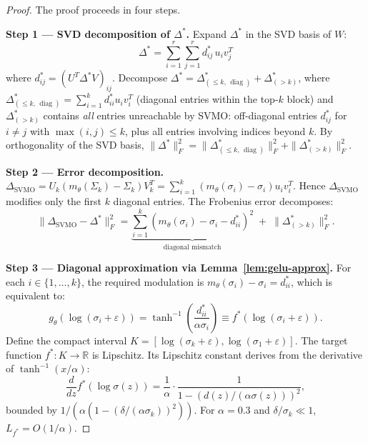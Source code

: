 \documentclass{scpe}
\newcommand{\RR}{\mathbb{R}}
\newcommand{\diag}{\operatorname{diag}}
\begin{document}
\begin{proof}
The proof proceeds in four steps.

\textbf{Step 1 --- SVD decomposition of $\Delta^*$.}
Expand $\Delta^*$ in the SVD basis of $W$:
\begin{equation}
\Delta^* = \sum_{i=1}^r \sum_{j=1}^r d_{ij}^* \, u_i v_j^T
\end{equation}
where $d_{ij}^* = (U^T \Delta^* V)_{ij}$. Decompose $\Delta^* = \Delta^*_{(\leq k,\, \diag)} + \Delta^*_{(>k)}$, where $\Delta^*_{(\leq k,\, \diag)} = \sum_{i=1}^k d_{ii}^* u_i v_i^T$ (diagonal entries within the top-$k$ block) and $\Delta^*_{(>k)}$ contains \textit{all} entries unreachable by SVMO: off-diagonal entries $d_{ij}^*$ for $i \neq j$ with $\max(i,j) \leq k$, plus all entries involving indices beyond $k$. By orthogonality of the SVD basis, $\|\Delta^*\|_F^2 = \|\Delta^*_{(\leq k,\, \diag)}\|_F^2 + \|\Delta^*_{(>k)}\|_F^2$.

\textbf{Step 2 --- Error decomposition.}
$\Delta_{\text{SVMO}} = U_k(m_\theta(\Sigma_k) - \Sigma_k)V_k^T = \sum_{i=1}^k (m_\theta(\sigma_i) - \sigma_i) u_i v_i^T$. Hence $\Delta_{\text{SVMO}}$ modifies only the first $k$ diagonal entries. The Frobenius error decomposes:
\begin{equation}
\|\Delta_{\text{SVMO}} - \Delta^*\|_F^2 = \underbrace{\sum_{i=1}^k (m_\theta(\sigma_i) - \sigma_i - d_{ii}^*)^2}_{\text{diagonal mismatch}} \;+\; \|\Delta^*_{(>k)}\|_F^2.
\end{equation}

\textbf{Step 3 --- Diagonal approximation via Lemma~\ref{lem:gelu-approx}.}
For each $i \in \{1,\dots,k\}$, the required modulation is $m_\theta(\sigma_i) - \sigma_i = d_{ii}^*$, which is equivalent to:
\begin{equation}
g_\theta(\log(\sigma_i + \varepsilon)) = \tanh^{-1}\!\left(\frac{d_{ii}^*}{\alpha\sigma_i}\right) \equiv f^*(\log(\sigma_i + \varepsilon)).
\end{equation}
Define the compact interval $K = [\log(\sigma_k + \varepsilon), \log(\sigma_1 + \varepsilon)]$. The target function $f^*: K \to \RR$ is Lipschitz. Its Lipschitz constant derives from the derivative of $\tanh^{-1}(x/\alpha)$:
\begin{equation}
\frac{d}{dz}f^*(\log\sigma(z)) = \frac{1}{\alpha} \cdot \frac{1}{1-(d(z)/(\alpha\sigma(z)))^2},
\end{equation}
bounded by $1/(\alpha(1-(\delta/(\alpha\sigma_k))^2))$. For $\alpha=0.3$ and $\delta/\sigma_k \ll 1$, $L_{f^*} = O(1/\alpha)$.


\end{proof}
\end{document}
